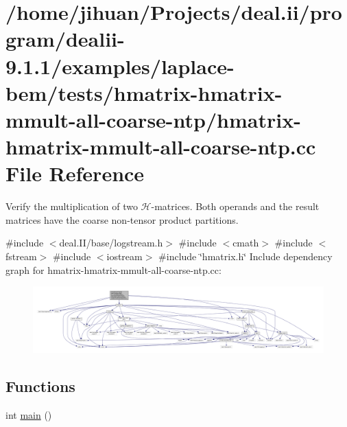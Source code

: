 \hypertarget{hmatrix-hmatrix-mmult-all-coarse-ntp_8cc}{}\section{/home/jihuan/\+Projects/deal.ii/program/dealii-\/9.1.1/examples/laplace-\/bem/tests/hmatrix-\/hmatrix-\/mmult-\/all-\/coarse-\/ntp/hmatrix-\/hmatrix-\/mmult-\/all-\/coarse-\/ntp.cc File Reference}
\label{hmatrix-hmatrix-mmult-all-coarse-ntp_8cc}


Verify the multiplication of two $\mathcal{H}$-\/matrices. Both operands and the result matrices have the coarse non-\/tensor product partitions.  


{\ttfamily \#include $<$deal.\+I\+I/base/logstream.\+h$>$}\newline
{\ttfamily \#include $<$cmath$>$}\newline
{\ttfamily \#include $<$fstream$>$}\newline
{\ttfamily \#include $<$iostream$>$}\newline
{\ttfamily \#include \char`\"{}hmatrix.\+h\char`\"{}}\newline
Include dependency graph for hmatrix-\/hmatrix-\/mmult-\/all-\/coarse-\/ntp.cc\+:
\nopagebreak
\begin{figure}[H]
\begin{center}
\leavevmode
\includegraphics[width=350pt]{hmatrix-hmatrix-mmult-all-coarse-ntp_8cc__incl}
\end{center}
\end{figure}
\subsection*{Functions}
\begin{DoxyCompactItemize}
\item 
int \hyperlink{hmatrix-hmatrix-mmult-all-coarse-ntp_8cc_ae66f6b31b5ad750f1fe042a706a4e3d4}{main} ()
\end{DoxyCompactItemize}


